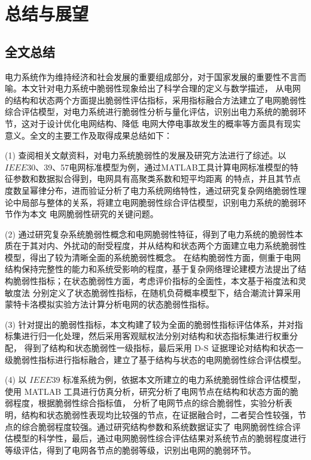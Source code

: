 \chapter{总结与展望}
\label{cha:summery}

\section{全文总结}
\label{sec:sum}
电力系统作为维持经济和社会发展的重要组成部分，对于国家发展的重要性不言而喻。本文针对电力系统中脆弱性现象给出了科学合理的定义与数学描述，
从电网的结构和状态两个方面提出脆弱性评估指标，采用指标融合方法建立了电网脆弱性综合评估模型，对电力系统进行脆弱性分析与量化评估，识别出电力系统的脆弱环节，这对于设计优化电网结构、降低
电网大停电事故发生的概率等方面具有现实意义。全文的主要工作及取得成果总结如下：

(1) 查阅相关文献资料，对电力系统脆弱性的发展及研究方法进行了综述。以$IEEE$30、39、57电网标准模型为例，通过MATLAB工具计算电网标准模型的特征参数和数据拟合得到，电网具有高聚类系数和短平均距离
的特点，并且其节点度数呈幂律分布，进而验证分析了电力系统网络特性，通过研究复杂网络脆弱性理论中局部与整体的关系，将建立电网脆弱性综合评估模型，识别电力系统的脆弱环节作为本文
电网脆弱性研究的关键问题。

(2) 通过研究复杂系统脆弱性概念和电网脆弱性特征，得到了电力系统的脆弱性本质在于其对内、外扰动的耐受程度，并从结构和状态两个方面建立电力系统脆弱性模型，得出了较为清晰全面的系统脆弱性概念。
在结构脆弱性方面，侧重于电网结构保持完整性的能力和系统受影响的程度，基于复杂网络理论建模方法提出了结构脆弱性指标；在状态脆弱性方面，考虑评价指标的全面性，本文基于裕度法和灵敏度法
分别定义了状态脆弱性指标，在随机负荷概率模型下，结合潮流计算采用蒙特卡洛模拟实验方法计算分析电网的状态脆弱性指标。

(3) 针对提出的脆弱性指标，本文构建了较为全面的脆弱性指标评估体系，并对指标集进行归一化处理，然后采用客观赋权法分别对结构和状态指标集进行权重分配，
得到了结构和状态脆弱性一级指标，最后采用 D-S 证据理论对结构和状态一级脆弱性指标进行指标融合，建立了基于结构与状态的电网脆弱性综合评估模型。

(4) 以 $IEEE39$ 标准系统为例，依据本文所建立的电力系统脆弱性综合评估模型，使用 MATLAB 工具进行仿真分析，研究分析了电网节点在结构和状态方面的脆弱程度，根据脆弱性综合指标值，
分析了电网节点的综合脆弱性，实验分析表明，结构和状态脆弱性表现均比较强的节点，在证据融合时，二者契合性较强，节点的综合脆弱程度较强。通过研究结构参数和系统数据证实了
电网脆弱性综合评估模型的科学性，最后，通过电网脆弱性综合评估结果对系统节点的脆弱程度进行等级评估，得到了电网各节点的脆弱等级，识别出电网的脆弱环节。

